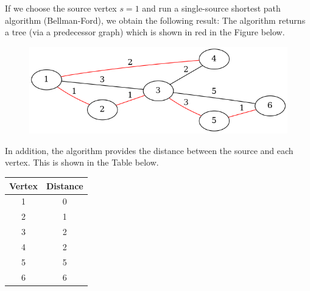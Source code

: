 If we choose the source vertex $s=1$ and run a single-source shortest path algorithm (Bellman-Ford), we obtain the following result: The algorithm returns a tree (via a predecessor graph) which is shown in red in the Figure below.


\begin{figure}[H]
\centering
\includegraphics[scale=0.5]{images/sssp_2.png}
\end{figure}

In addition, the algorithm provides the distance between the source and each vertex. This is shown in the Table below.

\begin{tabular}{c|c}
  Vertex & Distance \\ \hline
  1 & 0 \\
  2 & 1 \\
  3 & 2 \\
  4 & 2 \\
  5 & 5 \\
  6 & 6
\end{tabular}



